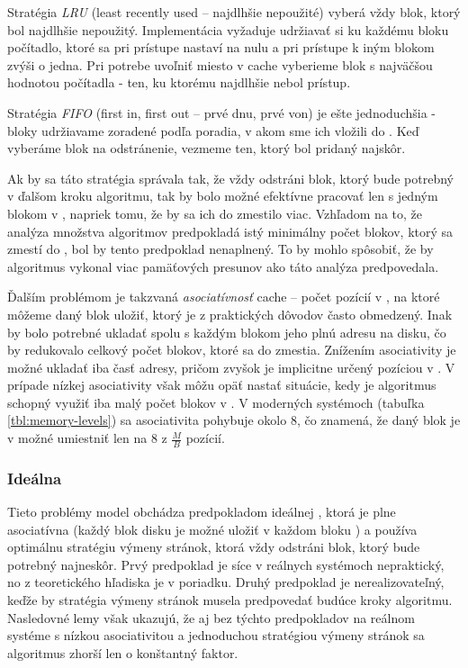 Stratégia \emph{LRU} (least recently used -- najdlhšie nepoužité) vyberá vždy blok, ktorý bol najdlhšie nepoužitý. Implementácia vyžaduje udržiavať si ku každému bloku počítadlo, ktoré sa pri prístupe nastaví na nulu a pri prístupe k iným blokom zvýši o jedna. Pri potrebe uvoľniť miesto v cache vyberieme blok s najväčšou hodnotou počítadla - ten, ku ktorému najdlhšie nebol prístup.

Stratégia \emph{FIFO} (first in, first out -- prvé dnu, prvé von) je ešte jednoduchšia - bloky udržiavame zoradené podľa poradia, v akom sme ich vložili do \cache. Keď vyberáme blok na odstránenie, vezmeme ten, ktorý bol pridaný najskôr.

Ak by sa táto stratégia správala tak, že vždy odstráni blok, ktorý bude potrebný v ďalšom kroku algoritmu, tak by bolo možné efektívne pracovať len s jedným blokom v \cache, napriek tomu, že by sa ich do \cache zmestilo viac. Vzhľadom na to, že analýza množstva \obliv algoritmov predpokladá istý minimálny počet blokov, ktorý sa zmestí do \cache, bol by tento predpoklad nenaplnený. To by mohlo spôsobiť, že by algoritmus vykonal viac pamäťových presunov ako táto analýza predpovedala.

Ďalším problémom je takzvaná \emph{asociatívnosť} cache -- počet pozícií v \cache, na ktoré môžeme daný blok uložiť, ktorý je z praktických dôvodov často obmedzený. Inak by bolo potrebné ukladať spolu s každým blokom jeho plnú adresu na disku, čo by redukovalo celkový počet blokov, ktoré sa do \cache zmestia. Znížením asociativity je možné ukladať iba časť adresy, pričom zvyšok je implicitne určený pozíciou v \cache. V prípade nízkej asociativity však môžu opäť nastať situácie, kedy je algoritmus schopný využiť iba malý počet blokov v \cache. V moderných systémoch (tabuľka \ref{tbl:memory-levels}) sa asociativita pohybuje okolo $8$, čo znamená, že daný blok je v \cache možné umiestniť len na $8$ z $\frac{M}{B}$ pozícií.

\subsubsection{Ideálna \cache}

Tieto problémy \obliv model obchádza predpokladom ideálnej \cache, ktorá je plne asociatívna (každý blok disku je možné uložiť v každom bloku \cache) a používa optimálnu stratégiu výmeny stránok, ktorá vždy odstráni blok, ktorý bude potrebný najneskôr. Prvý predpoklad je síce v reálnych systémoch nepraktický, no z teoretického hľadiska je v poriadku. Druhý predpoklad je nerealizovateľný, keďže by stratégia výmeny stránok musela predpovedať budúce kroky algoritmu. Nasledovné lemy však ukazujú, že aj bez týchto predpokladov na reálnom systéme s nízkou asociativitou a jednoduchou stratégiou výmeny stránok sa algoritmus zhorší len o konštantný faktor.

